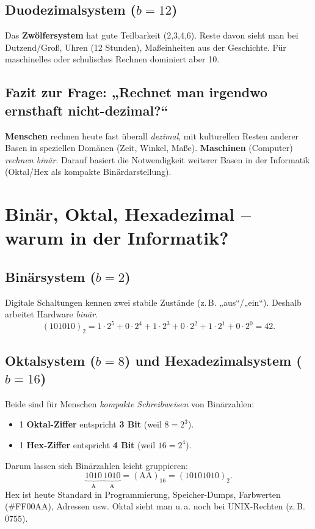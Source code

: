 \documentclass[../skript/main.tex]{subfiles}
\begin{document}
\subsection*{Duodezimalsystem (\(b=12\))}
Das \textbf{Zwölfersystem} hat gute Teilbarkeit (2,3,4,6). Reste davon sieht man bei Dutzend/Groß, Uhren (12 Stunden), Maßeinheiten aus der Geschichte. Für maschinelles oder schulisches Rechnen dominiert aber 10.

\subsection*{Fazit zur Frage: „Rechnet man irgendwo ernsthaft nicht-dezimal?“}
\textbf{Menschen} rechnen heute fast überall \emph{dezimal}, mit kulturellen Resten anderer Basen in speziellen Domänen (Zeit, Winkel, Maße).  
\textbf{Maschinen} (Computer) \emph{rechnen binär}. Darauf basiert die Notwendigkeit weiterer Basen in der Informatik (Oktal/Hex als kompakte Binärdarstellung).

\section{Binär, Oktal, Hexadezimal – warum in der Informatik?}
\subsection*{Binärsystem (\(b=2\))}
Digitale Schaltungen kennen zwei stabile Zustände (z.\,B. „aus“/„ein“). Deshalb arbeitet Hardware \emph{binär}.
\[
(101010)_2 = 1\cdot 2^5 + 0\cdot 2^4 + 1\cdot 2^3 + 0\cdot 2^2 + 1\cdot 2^1 + 0\cdot 2^0 = 42.
\]

\subsection*{Oktalsystem (\(b=8\)) und Hexadezimalsystem (\(b=16\))}
Beide sind für Menschen \emph{kompakte Schreibweisen} von Binärzahlen:
\begin{itemize}
	\item 1 \textbf{Oktal-Ziffer} entspricht \textbf{3 Bit} (weil \(8=2^3\)).
	\item 1 \textbf{Hex-Ziffer} entspricht \textbf{4 Bit} (weil \(16=2^4\)).
\end{itemize}
Darum lassen sich Binärzahlen leicht gruppieren:
\[
\underbrace{1010}_{\text{A}}\,\underbrace{1010}_{\text{A}} = (\text{AA})_{16} = (10101010)_2.
\]
Hex ist heute Standard in Programmierung, Speicher-Dumps, Farbwerten (\#FF00AA), Adressen usw.
Oktal sieht man u.\,a. noch bei UNIX-Rechten (z.\,B. \(0755\)).
\end{document}
